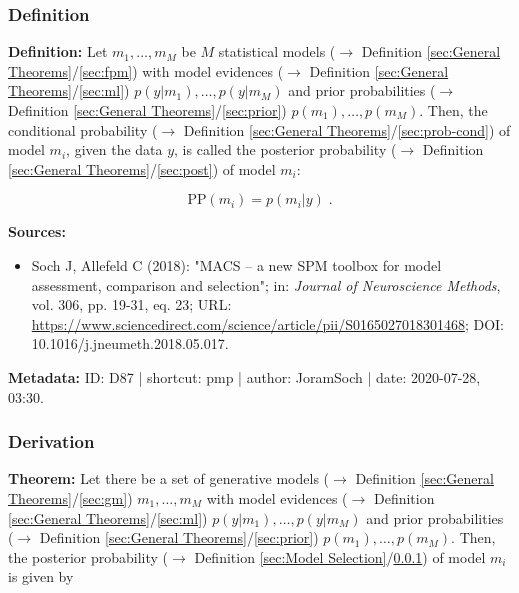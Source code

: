 \documentclass[a4paper,12pt,twoside]{book}
\begin{document}
\subsubsection[\textit{Definition}]{Definition} \label{sec:pmp}
\setcounter{equation}{0}

\textbf{Definition:} Let $m_1, \ldots, m_M$ be $M$ statistical models ($\rightarrow$ Definition \ref{sec:General Theorems}/\ref{sec:fpm}) with model evidences ($\rightarrow$ Definition \ref{sec:General Theorems}/\ref{sec:ml}) $p(y \vert m_1), \ldots, p(y \vert m_M)$ and prior probabilities ($\rightarrow$ Definition \ref{sec:General Theorems}/\ref{sec:prior})  $p(m_1), \ldots, p(m_M)$. Then, the conditional probability ($\rightarrow$ Definition \ref{sec:General Theorems}/\ref{sec:prob-cond}) of model $m_i$, given the data $y$, is called the posterior probability ($\rightarrow$ Definition \ref{sec:General Theorems}/\ref{sec:post}) of model $m_i$:

\begin{equation} \label{eq:pmp-PMP}
\mathrm{PP}(m_i) = p(m_i|y) \; .
\end{equation}


\vspace{1em}
\textbf{Sources:}
\begin{itemize}
\item Soch J, Allefeld C (2018): "MACS – a new SPM toolbox for model assessment, comparison and selection"; in: \textit{Journal of Neuroscience Methods}, vol. 306, pp. 19-31, eq. 23; URL: \url{https://www.sciencedirect.com/science/article/pii/S0165027018301468}; DOI: 10.1016/j.jneumeth.2018.05.017.
\end{itemize}


\vspace{1em}
\textbf{Metadata:} ID: D87 | shortcut: pmp | author: JoramSoch | date: 2020-07-28, 03:30.
\vspace{1em}



\subsubsection[\textbf{Derivation}]{Derivation} \label{sec:pmp-der}
\setcounter{equation}{0}

\textbf{Theorem:} Let there be a set of generative models ($\rightarrow$ Definition \ref{sec:General Theorems}/\ref{sec:gm}) $m_1, \ldots, m_M$ with model evidences ($\rightarrow$ Definition \ref{sec:General Theorems}/\ref{sec:ml}) $p(y \vert m_1), \ldots, p(y \vert m_M)$ and prior probabilities ($\rightarrow$ Definition \ref{sec:General Theorems}/\ref{sec:prior})  $p(m_1), \ldots, p(m_M)$. Then, the posterior probability ($\rightarrow$ Definition \ref{sec:Model Selection}/\ref{sec:pmp}) of model $m_i$ is given by
\end{document}
